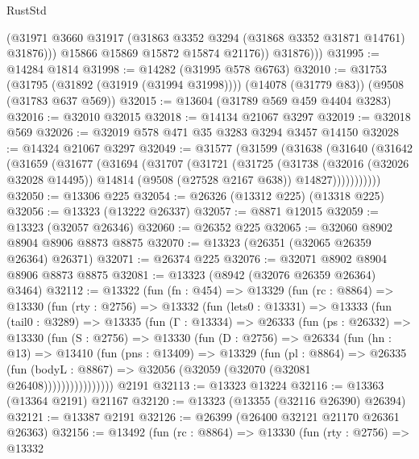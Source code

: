 \begin{lexlean}{RustStd}
\begin{coremodule}
                (@31971 @3660 @31917 (@31863 @3352 @3294 (@31868 @3352 @31871 @14761) @31876)))
              @15866
              @15869
              @15872
              @15874
              @21176))
          @31876)))
@31995 := @14284 @1814
@31998 := @14282 (@31995 @578 @6763)
@32010 := @31753
    (@31795 (@31892 (@31919 (@31994 @31998))))
    (@14078 (@31779 @83))
    (@9508 (@31783 @637 @569))
@32015 := @13604 (@31789 @569 @459 @4404 @3283)
@32016 := @32010 @32015
@32018 := @14134 @21067 @3297
@32019 := @32018 @569
@32026 := @32019 @578 @471 @35 @3283 @3294 @3457 @14150
@32028 := @14324 @21067 @3297
@32049 := @31577
    (@31599
      (@31638
        (@31640
          (@31642
            (@31659
              (@31677
                (@31694
                  (@31707
                    (@31721
                      (@31725
                        (@31738
                          (@32016 (@32026 @32028 @14495))
                          @14814
                          (@9508 (@27528 @2167 @638))
                          @14827)))))))))))
@32050 := @13306 @225
@32054 := @26326 (@13312 @225) (@13318 @225)
@32056 := @13323 (@13222 @26337)
@32057 := @8871 @12015
@32059 := @13323 (@32057 @26346)
@32060 := @26352 @225
@32065 := @32060 @8902 @8904 @8906 @8873 @8875
@32070 := @13323 (@26351 (@32065 @26359 @26364) @26371)
@32071 := @26374 @225
@32076 := @32071 @8902 @8904 @8906 @8873 @8875
@32081 := @13323 (@8942 (@32076 @26359 @26364) @3464)
@32112 := @13322
    (fun (fn : @454) =>
    @13329
      (fun (rc : @8864) =>
      @13330
        (fun (rty : @2756) =>
        @13332
          (fun (lets0 : @13331) =>
          @13333
            (fun (tail0 : @3289) =>
            @13335
              (fun (Γ : @13334) =>
              @26333
                (fun (ps : @26332) =>
                @13330
                  (fun (S : @2756) =>
                  @13330
                    (fun (D : @2756) =>
                    @26334
                      (fun (hn : @13) =>
                      @13410
                        (fun (pns : @13409) =>
                        @13329
                          (fun (pl : @8864) =>
                          @26335
                            (fun (bodyL : @8867) =>
                            @32056 (@32059 (@32070 (@32081 @26408))))))))))))))))
    @2191
@32113 := @13323 @13224
@32116 := @13363 (@13364 @2191) @21167
@32120 := @13323 (@13355 (@32116 @26390) @26394)
@32121 := @13387 @2191
@32126 := @26399 (@26400 @32121 @21170 @26361 @26363)
@32156 := @13492
    (fun (rc : @8864) =>
    @13330
      (fun (rty : @2756) =>
      @13332

\end{coremodule}
\end{lexlean}
